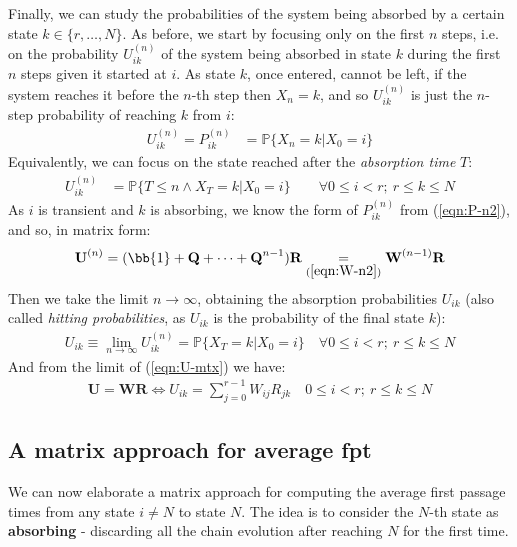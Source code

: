 \documentclass[../template.tex]{subfiles}
\begin{document}
Finally, we can study the probabilities of the system being absorbed by a certain state $k \in \{r,\dots,N\}$. As before, we start by focusing only on the first $n$ steps, i.e. on the probability $U_{ik}^{(n)}$ of the system being absorbed in state $k$ during the first $n$ steps given it started at $i$. As state $k$, once entered, cannot be left, if the system reaches it before the $n$-th step then $X_n = k$, and so $U_{ik}^{(n)}$ is just the $n$-step probability of reaching $k$ from $i$:
\begin{align*}
    U_{ik}^{(n)} = P_{ik}^{(n)} &= \mathbb{P}\{X_n = k | X_0 = i\}
\end{align*}
Equivalently, we can focus on the state reached after the \textit{absorption time} $T$:
\begin{align*}
    U_{ik}^{(n)} &= \mathbb{P}\{T \leq n \land  X_T=k|X_0 = i\} \qquad \forall 0\leq i<r; \> r\leq k \leq N
\end{align*}
As $i$ is transient and $k$ is absorbing, we know the form of $P_{ik}^{(n)}$ from (\ref{eqn:P-n2}), and so, in matrix form:
\begin{align}\label{eqn:U-mtx}
    \textbf{U}^{(n)} = (\bb{1} + \textbf{Q} + \dots + \textbf{Q}^{n-1}) \textbf{R} \underset{(\ref{eqn:W-n2})}{=}  \textbf{W}^{(n-1)} \textbf{R}    
\end{align} 
Then we take the limit $n \to \infty$, obtaining the absorption probabilities $U_{ik}$ (also called \textit{hitting probabilities}, as $U_{ik}$ is the probability of  the final state $k$):
\begin{align*}
    U_{ik} \equiv \lim_{n \to \infty} U_{ik}^{(n)} = \mathbb{P}\{X_T = k|X_0 = i\} \quad \forall 0 \leq i < r; \> r\leq k \leq N
\end{align*}
And from the limit of (\ref{eqn:U-mtx}) we have:
\begin{align*}
    \textbf{U} = \textbf{WR} \Leftrightarrow U_{ik} = \sum_{j=0}^{r-1} W_{ij} R_{jk} \quad 0 \leq i < r; \> r \leq k \leq N    
\end{align*}

\subsection{A matrix approach for average fpt}
We can now elaborate a matrix approach for computing the average first passage times from any state $i\neq N$ to state $N$. The idea is to consider the $N$-th state as \textbf{absorbing} - discarding all the chain evolution after reaching $N$ for the first time.
\end{document}
